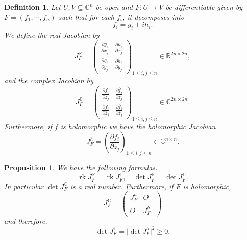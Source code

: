 \documentclass{article}
\newtheorem{proposition}{Proposition}[section]
\newtheorem{definition}{Definition}[section]
\DeclareMathOperator{\rk}{rk}
\newcommand{\R}[0]{\mathbb{R}}
\newcommand{\C}[0]{\mathbb{C}}
\newcommand{\pd}[2]{{\frac {\partial#1} {\partial#2}}}
\begin{document}
\begin{definition}
Let $U,V\subseteq\C^n$ be open and $F:U\to V$ be differentiable given by $F=(f_1,\cdots,f_n)$ such that for each $f_i$, it decomposes into
\begin{equation*}
f_i = g_i+ih_i.
\end{equation*}
We define the real Jacobian by
\begin{equation*}
J^\R_F = \begin{pmatrix}
\pd{g_i}{x_j}&\pd{h_i}{x_j}\\
\pd{g_i}{y_j}&\pd{h_i}{y_j}
\end{pmatrix}_{1\leq i,j\leq n}\in\R^{2n\times 2n},
\end{equation*}
and the complex Jacobian by
\begin{equation*}
J^\C_F = \begin{pmatrix}
\pd{f_i}{z_j}&\pd{\overline{f}_i}{z_j}\\
\pd{f_i}{\overline{z}_j}&\pd{\overline{f}_i}{\overline{z}_j}
\end{pmatrix}_{1\leq i,j\leq n}\in\C^{2n\times 2n}.
\end{equation*}
Furthermore, if $f$ is holomorphic we have the holomorphic Jacobian
\begin{equation*}
J^h_F =
\left(\pd{f_i}{z_j}\right)_{1\leq i,j\leq n}\in\C^{n\times n}.
\end{equation*}
\end{definition}

\begin{proposition}
We have the following formulas.
\begin{equation*}
\rk J^\R_F = \rk J^\C_F, \quad \det J^\R_F = \det J^\C_F. 
\end{equation*}
In particular $\det J^\C_F$ is a real number. Furthermore, if $F$ is holomorphic, 
\begin{equation*}
J^\C_F = \begin{pmatrix}
J_F^h&O\\
O& \overline{J_F^h}.
\end{pmatrix}
\end{equation*}
and therefore,
\begin{equation*}
\det J_F^\C = \vert\det J_F^h\vert ^2\geq 0.
\end{equation*}
\end{proposition}
\end{document}

